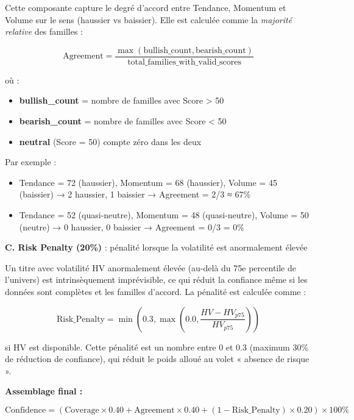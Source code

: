\documentclass{rapportENSIAS} %
\begin{document}
\noindent
Cette composante capture le degré d'accord entre Tendance, Momentum et Volume sur le sens (haussier vs baissier). Elle est calculée comme la \textit{majorité relative} des familles :

\[
\text{Agreement} = \frac{\max(\text{bullish\_count}, \text{bearish\_count})}{\text{total\_families\_with\_valid\_scores}}
\]

\noindent
où :
\begin{itemize}
    \item \textbf{bullish\_count} = nombre de familles avec Score > 50
    \item \textbf{bearish\_count} = nombre de familles avec Score < 50
    \item \textbf{neutral} (Score = 50) compte zéro dans les deux
\end{itemize}

\noindent
Par exemple :
\begin{itemize}
    \item Tendance = 72 (haussier), Momentum = 68 (haussier), Volume = 45 (baissier) → 2 haussier, 1 baissier → Agreement = 2/3 ≈ 67\%
    \item Tendance = 52 (quasi-neutre), Momentum = 48 (quasi-neutre), Volume = 50 (neutre) → 0 haussier, 0 baissier → Agreement = 0/3 = 0\%
\end{itemize}

\vspace{0.3cm}
\noindent
\textbf{C. Risk Penalty (20\%)} : pénalité lorsque la volatilité est anormalement élevée

\noindent
Un titre avec volatilité HV anormalement élevée (au-delà du 75e percentile de l'univers) est intrinsèquement imprévisible, ce qui réduit la confiance même si les données sont complètes et les familles d'accord. La pénalité est calculée comme :

\[
\text{Risk\_Penalty} = \min\left(0.3, \max\left(0.0, \frac{HV - HV_{p75}}{HV_{p75}}\right)\right)
\]

\noindent
si HV est disponible. Cette pénalité est un nombre entre 0 et 0.3 (maximum 30\% de réduction de confiance), qui réduit le poids alloué au volet « absence de risque ».

\vspace{0.3cm}
\noindent
\textbf{Assemblage final :}

\[
\text{Confidence} = \left( \text{Coverage} \times 0.40 + \text{Agreement} \times 0.40 + (1 - \text{Risk\_Penalty}) \times 0.20 \right) \times 100\%
\]
\end{document}
